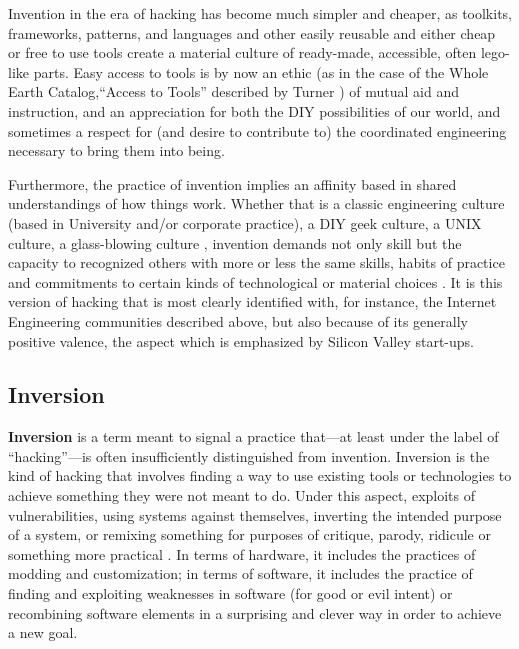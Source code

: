 \documentclass[10pt,letter,oneside]{scrartcl}
\begin{document}
Invention in the era of hacking has become much simpler and cheaper, as
toolkits, frameworks, patterns, and languages and other easily reusable and
either cheap or free to use tools create a material culture of ready-made,
accessible, often lego-like parts.  Easy access to tools is by now an ethic (as
in the case of the Whole Earth Catalog,``Access to Tools'' described by Turner
\parencite*{turner_counterculture_2006}) of mutual aid and instruction, and an
appreciation for both the DIY possibilities of our world, and sometimes a
respect for (and desire to contribute to) the coordinated engineering necessary
to bring them into being.

Furthermore, the practice of invention implies an affinity based in shared
understandings of how things work.  Whether that is a classic engineering
culture (based in University and/or corporate practice), a DIY geek culture, a
UNIX culture, a glass-blowing culture \autocite{o2005embodied}, invention
demands not only skill but the capacity to recognized others with more or less
the same skills, habits of practice and commitments to certain kinds of
technological or material choices \autocite{Sennett2008}.  It is this version
of hacking that is most clearly identified with, for instance, the Internet
Engineering communities described above, but also because of its generally
positive valence, the aspect which is emphasized by Silicon Valley start-ups.

\subsection*{Inversion}

\textbf{Inversion} is a term meant to signal a practice that---at least under
the label of ``hacking''---is often insufficiently distinguished from invention.
Inversion is the kind of hacking that involves finding a way to use existing
tools or technologies to achieve something they were not meant to do.  Under
this aspect, exploits of vulnerabilities, using systems against themselves,
inverting the intended purpose of a system, or remixing something for purposes
of critique, parody, ridicule or something more practical
\autocite{galloway2007exploit}.  In terms of hardware, it includes the practices of
modding and customization; in terms of software, it includes the practice of
finding and exploiting weaknesses in software (for good or evil intent) or
recombining software elements in a surprising and clever way in order to achieve
a new goal.
\end{document}

